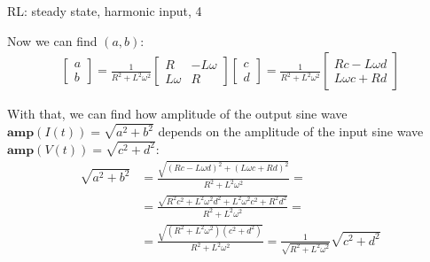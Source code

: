 \documentclass{beamer}
\begin{document}
\begin{frame}{RL: steady state, harmonic input, 4}
	\begin{flushleft}
		
		Now we can find $(a, b)$:
		\begin{align*}
			\begin{bmatrix}
				a \\ b
			\end{bmatrix}
			=
			\frac{1}{R^2 + L^2 \omega^2}
			\begin{bmatrix}
				R & -L\omega \\
				L\omega & R
			\end{bmatrix}		
			\begin{bmatrix}
				c \\ d
			\end{bmatrix}
		=
		\frac{1}{R^2 + L^2 \omega^2}
		\begin{bmatrix}
			Rc - L\omega d \\
			L\omega c + R d
		\end{bmatrix}		
		\end{align*}
	
		With that, we can find how amplitude of the output sine wave $\mathbf{amp}(I(t)) = \sqrt{a^2 + b^2}$ depends on the amplitude of the input sine wave $\mathbf{amp}(V(t)) = \sqrt{c^2 + d^2}$:
		\begin{align*}
			\sqrt{a^2 + b^2}
			&=
			\frac{\sqrt{(Rc - L\omega d)^2 + (L\omega c + R d)^2}}{R^2 + L^2 \omega^2}= \\
			&= \frac{\sqrt{R^2 c^2 + L^2\omega^2 d^2 + L^2\omega^2 c^2+ R^2 d^2}}{R^2 + L^2 \omega^2}=
			\\
			&= \frac{\sqrt{(R^2+ L^2\omega^2) (c^2 + d^2) }}{R^2 + L^2 \omega^2}
			=
			\frac{1}{\sqrt{R^2 + L^2 \omega^2}} \sqrt{c^2 + d^2}
		\end{align*}
		
		
		
	\end{flushleft}
\end{frame}
\end{document}

